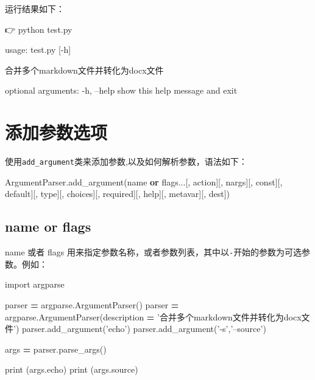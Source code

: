 \documentclass[]{ctexbook}
\newenvironment{Shaded}{\begin{snugshade}}{\end{snugshade}}
\newcommand{\BuiltInTok}[1]{#1}
\newcommand{\ExtensionTok}[1]{#1}
\newcommand{\ImportTok}[1]{#1}
\newcommand{\KeywordTok}[1]{\textcolor[rgb]{0.13,0.29,0.53}{\textbf{#1}}}
\newcommand{\NormalTok}[1]{#1}
\newcommand{\OperatorTok}[1]{\textcolor[rgb]{0.81,0.36,0.00}{\textbf{#1}}}
\newcommand{\StringTok}[1]{\textcolor[rgb]{0.31,0.60,0.02}{#1}}
\begin{document}
运行结果如下：

\begin{Shaded}
\begin{Highlighting}[]
\NormalTok{ 👉  }\ExtensionTok{python}\NormalTok{ test.py}

\ExtensionTok{usage}\NormalTok{: test.py [-h]}

\NormalTok{合并多个}\ExtensionTok{markdown}\NormalTok{文件并转化为docx文件}

\ExtensionTok{optional}\NormalTok{ arguments:}
  \ExtensionTok{-h}\NormalTok{, --help  show this help message and exit}
\end{Highlighting}
\end{Shaded}

\hypertarget{ux6dfbux52a0ux53c2ux6570ux9009ux9879}{%
\section{添加参数选项}\label{ux6dfbux52a0ux53c2ux6570ux9009ux9879}}

使用\texttt{add\_argument}类来添加参数,以及如何解析参数，语法如下：

\begin{Shaded}
\begin{Highlighting}[]
\NormalTok{ArgumentParser.add_argument(name }\KeywordTok{or}\NormalTok{ flags...[, action][, nargs][, const][, default][, }\BuiltInTok{type}\NormalTok{][, choices][, required][, }\BuiltInTok{help}\NormalTok{][, metavar][, dest])}
\end{Highlighting}
\end{Shaded}

\hypertarget{name-or-flags}{%
\subsection{name or flags}\label{name-or-flags}}

name 或者 flags 用来指定参数名称，或者参数列表，其中以\texttt{-}开始的参数为可选参数。例如：

\begin{Shaded}
\begin{Highlighting}[]
\ImportTok{import}\NormalTok{ argparse}

\NormalTok{parser }\OperatorTok{=}\NormalTok{ argparse.ArgumentParser()}
\NormalTok{parser }\OperatorTok{=}\NormalTok{ argparse.ArgumentParser(description }\OperatorTok{=} \StringTok{'合并多个markdown文件并转化为docx文件'}\NormalTok{)}
\NormalTok{parser.add_argument(}\StringTok{'echo'}\NormalTok{)}
\NormalTok{parser.add_argument(}\StringTok{'-s'}\NormalTok{,}\StringTok{'--source'}\NormalTok{)}

\NormalTok{args }\OperatorTok{=}\NormalTok{ parser.parse_args()}

\BuiltInTok{print}\NormalTok{ (args.echo)}
\BuiltInTok{print}\NormalTok{ (args.source)}
\end{Highlighting}
\end{Shaded}
\end{document}

